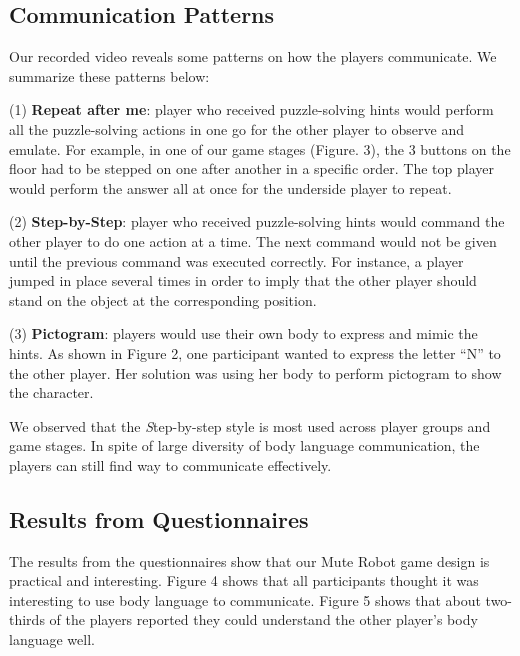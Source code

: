 \documentclass{chi-ext}
\begin{document}
\subsection{Communication Patterns}

 Our recorded video reveals some patterns on how the players communicate. We summarize these patterns below:

(1) {\bf Repeat after me}: player who received puzzle-solving hints would perform all the puzzle-solving actions in one go for the other player to observe and emulate. For example, in one of our game stages (Figure. 3), the 3 buttons on the floor had to be stepped on one after another in a specific order. The top player would perform the answer all at once for the underside player to repeat.

(2) {\bf Step-by-Step}: player who received puzzle-solving hints would command the other player to do one action at a time. The next command would not be given until the previous command was executed correctly. For instance, a player jumped in place several times in order to imply that the other player should stand on the object at the corresponding position.

(3) {\bf Pictogram}: players would use their own body to express and mimic the hints. As shown in Figure 2, one participant wanted to express the letter ``N'' to the other player. Her solution was using her body to perform pictogram to show the character.

We observed that the {\emph Step-by-step style} is most used across player groups and game stages. 
In spite of large diversity of body language communication, the players can still find way to communicate effectively.


%
\subsection{Results from Questionnaires}

The results from the questionnaires show that our Mute Robot game design is practical and interesting. 
Figure 4 shows that all participants thought it was interesting to use body language to communicate.
Figure 5 shows that about two-thirds of the players reported they could understand the other player's body language well.
\end{document}
